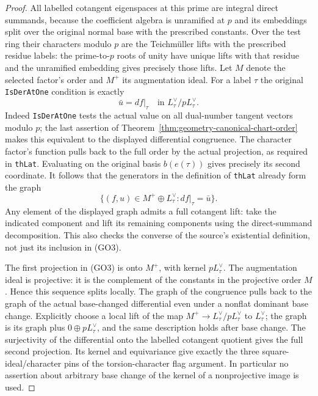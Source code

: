 \begin{proof}
All labelled cotangent eigenspaces at this prime are integral
direct summands, because the coefficient algebra is
unramified at \(p\) and its embeddings split over the
original normal base with the prescribed constants.
Over the test ring their characters modulo \(p\) are the
Teichm\"uller lifts with the prescribed residue labels:
the prime-to-\(p\) roots of unity have unique lifts with
that residue and the unramified embedding gives precisely
those lifts. Let \(M\) denote the selected factor's order
and \(M^+\) its augmentation ideal. For a label \(\tau\) the
original \texttt{IsDerAtOne} condition is exactly
\[
         \bar u = d f|_\tau\quad
                     \text{in }L_\tau^\vee/p L_\tau^\vee.
\]
Indeed \texttt{IsDerAtOne} tests the actual value on all
dual-number tangent vectors modulo \(p\); the last assertion
of Theorem~\ref{thm:geometry-canonical-chart-order} makes
this equivalent to the displayed differential congruence.
The character factor's function pulls back to the full
order by the actual projection, as required in
\texttt{thLat}. Evaluating on the original basis
\(b(e(\tau))\) gives precisely its second coordinate.
It follows that the generators in the definition of
\texttt{thLat} already form the graph
\[
        \{(f,u)\in M^+\oplus L_\tau^\vee:
                         d f|_\tau=\bar u\}.
                                                               \tag{GO3}
\]
Any element of the displayed graph admits a full cotangent
lift: take the indicated component and lift its remaining
components using the direct-summand decomposition.
This also checks the converse of the source's existential
definition, not just its inclusion in (GO3).

The first projection in (GO3) is onto \(M^+\), with kernel
\(p L_\tau^\vee\). The augmentation ideal is projective:
it is the complement of the constants in the projective
order \(M\). Hence this sequence splits locally. The graph
of the congruence pulls back to the graph of the actual
base-changed differential even under a nonflat dominant
base change. Explicitly choose a local lift of the map
\(M^+\to L_\tau^\vee/pL_\tau^\vee\) to \(L_\tau^\vee\);
the graph is its graph plus \(0\oplus pL_\tau^\vee\),
and the same description holds after base change.
The surjectivity of the differential onto the labelled
cotangent quotient gives the full second projection.
Its kernel and equivariance give exactly the three
square-ideal/character pins of the torsion-character flag
argument. In particular no assertion about arbitrary
base change of the kernel of a nonprojective image is used.


\end{proof}
